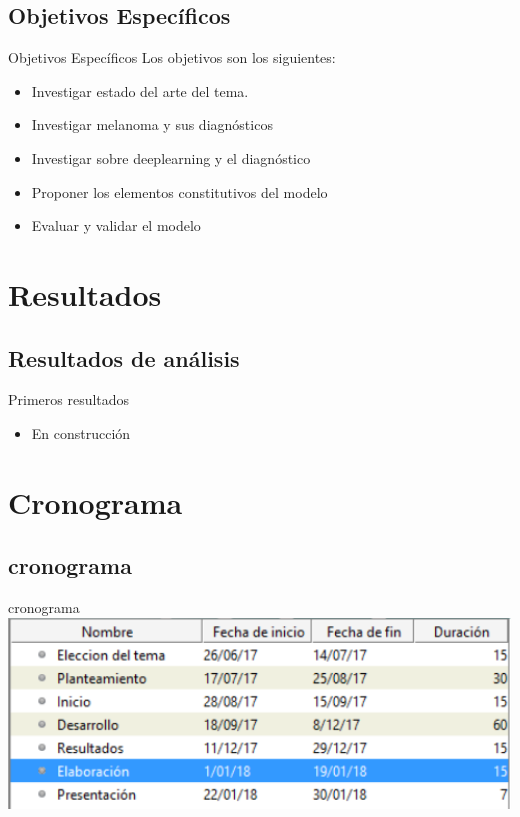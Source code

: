 \documentclass{beamer}
\begin{document}
\subsection{Objetivos Específicos}

\begin{frame}{Objetivos Específicos}
Los objetivos son los siguientes:
\begin{itemize}
	\item Investigar estado del arte del tema.
	\item Investigar melanoma y sus diagnósticos
	\item Investigar sobre deeplearning y el diagnóstico
	\item Proponer los elementos constitutivos del modelo
	\item Evaluar y validar el modelo
	
\end{itemize}
\end{frame}

\section{Resultados}
\subsection{Resultados de análisis}

\begin{frame}{Primeros resultados}

\begin{itemize}
	\item En construcción
\end{itemize}
\end{frame}



\section{Cronograma}

\subsection{cronograma}

\begin{frame}{cronograma}
\includegraphics[width=1.1\textwidth]{images/cronograma.png}
\end{frame}
\end{document}
